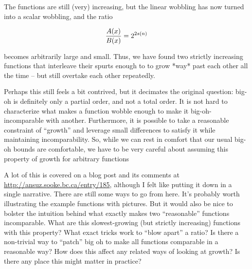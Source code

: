 \documentclass[11pt]{amsart}
\begin{document}
The functions are still (very) increasing, but the linear wobbling has now turned into a scalar wobbling, and the ratio

$${A(x) \over B(x)} = 2^{2 s(n)}$$

becomes arbitrarily large and small. Thus, we have found two strictly increasing functions that interleave their spurts enough to to grow *way* past each other all the time -- but still overtake each other repeatedly.

Perhaps this still feels a bit contrived, but it decimates the original question: big-oh is definitely only a partial order, and not a total order. It is not hard to characterize what makes a function wobble enough to make it big-oh-incomparable with another. Furthermore, it is possible to take a reasonable constraint of ``growth'' and leverage small differences to satisfy it while maintaining incomparability. So, while we can rest in comfort that our usual big-oh bounds are comfortable, we have to be very careful about assuming this property of growth for arbitrary functions

A lot of this is covered on a blog post and its comments at \url{http://ansuz.sooke.bc.ca/entry/185}, although I felt like putting it down in a single narrative. There are still some ways to go from here. It's probably worth illustrating the example functions with pictures. But it would also be nice to bolster the intuition behind what exactly makes two ``reasonable'' functions incomparable. What are this slowest-growing (but strictly increasing) functions with this property? What exact tricks work to ``blow apart'' a ratio? Is there a non-trivial way to ``patch'' big oh to make all functions comparable in a reasonable way? How does this affect any related ways of looking at growth? Is there any place this might matter in practice?
\end{document}
